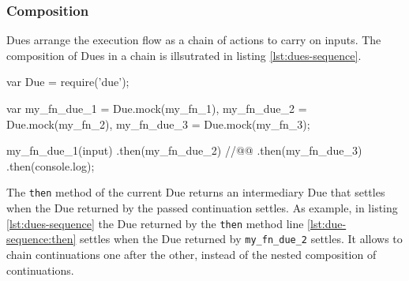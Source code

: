 

\subsubsection{Composition}

Dues arrange the execution flow as a chain of actions to carry on inputs.
The composition of Dues in a chain is illsutrated in listing \ref{lst:dues-sequence}. %

\begin{code}[js, %
             caption={Dues are chained like Promises}, %
             label={lst:dues-sequence}] %
var Due = require('due');

var my_fn_due_1 = Due.mock(my_fn_1),
    my_fn_due_2 = Due.mock(my_fn_2),
    my_fn_due_3 = Due.mock(my_fn_3);

my_fn_due_1(input)
.then(my_fn_due_2) //@\label{lst:due-sequence:then}@
.then(my_fn_due_3)
.then(console.log);
\end{code}

The \texttt{then} method of the current Due returns an intermediary Due that settles when the Due returned by the passed continuation settles.
As example, in listing \ref{lst:dues-sequence} the Due returned by the \texttt{then} method line \ref{lst:due-sequence:then} settles when the Due returned by \texttt{my\_fn\_due\_2} settles.
It allows to chain continuations one after the other, instead of the nested composition of continuations.







